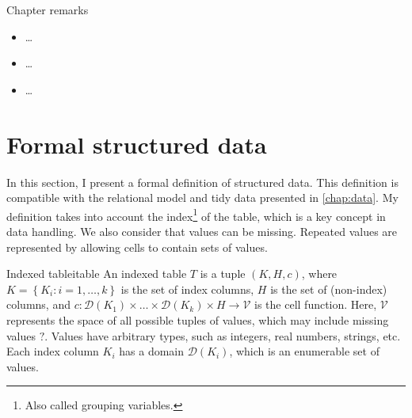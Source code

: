 \begin{mainbox}{Chapter remarks}


  \startcontents[chapters]
  \vspace{1em}


  \begin{itemize}
    \item \dots
  \end{itemize}


  \begin{itemize}
    \item \dots
  \end{itemize}


  \begin{itemize}
    \item \dots
  \end{itemize}
\end{mainbox}

{}
\clearpage

\section{Formal structured data}

\newcommand{\domainof}[1]{\mathcal{D}\!\left(#1\right)}
\newcommand{\missing}{\text{?}}
\newcommand{\rowcard}[1][k_1, \dots, k_k]{\operatorname{card}\!\left(#1\right)}

In this section, I present a formal definition of structured data.  This definition is
compatible with the relational model and tidy data presented in \cref{chap:data}.
My definition takes into account the index\footnote{Also called grouping variables.} of
the table, which is a key concept in data handling.  We also consider that values can be
missing.  Repeated values are represented by allowing cells to contain sets of values.

\begin{defbox}{Indexed table}{itable}
An indexed table $T$ is a tuple $(K, H, c)$, where $K = \left\{K_i : i = 1, \dots,
k\right\}$ is the set of index columns, $H$ is the set of (non-index) columns, and $c :
\domainof{K_1} \times \dots \times \domainof{K_k} \times H \to \mathcal{V}$ is the cell function.
Here, $\mathcal{V}$ represents the space of all possible tuples of values, which
may include missing values $\missing$.  Values have arbitrary types, such as integers,
real numbers, strings, etc.
Each index column $K_i$ has a domain $\domainof{K_i}$, which is an enumerable set of
values.
\end{defbox}

